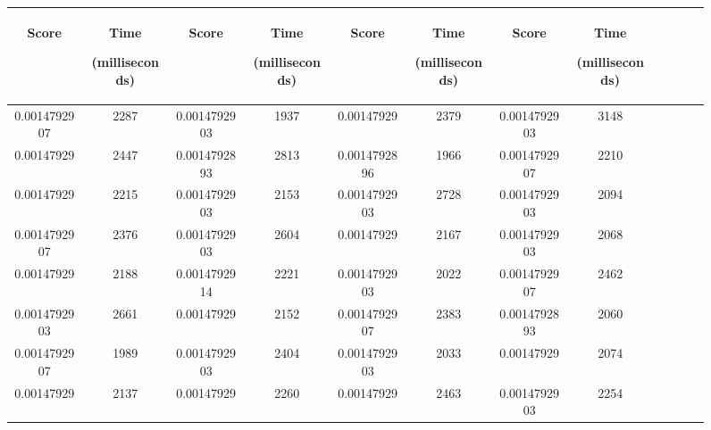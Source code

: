 \begin{figure}[h]
  \centering
  \begin{tabular}{|c|c|c|c|c|c|c|c|c|c|c|c|} 
  \midrule
 \begin{sideways}Score\end{sideways}& \begin{sideways}Time\end{sideways} \begin{sideways} (milliseconds)\end{sideways}& \begin{sideways}Score\end{sideways}& \begin{sideways}Time\end{sideways}  \begin{sideways}(milliseconds)\end{sideways}& \begin{sideways}Score\end{sideways}& \begin{sideways}Time\end{sideways}  \begin{sideways}(milliseconds)\end{sideways}& \begin{sideways}Score\end{sideways}& \begin{sideways}Time\end{sideways}  \begin{sideways} (milliseconds)\end{sideways}\\
\midrule
0.0014792907&2287&0.0014792903&1937&0.00147929&2379&0.0014792903&3148\\
\midrule
0.00147929&2447&0.0014792893&2813&0.0014792896&1966&0.0014792907&2210\\
\midrule
0.00147929&2215&0.0014792903&2153&0.0014792903&2728&0.0014792903&2094\\
\midrule
0.0014792907&2376&0.0014792903&2604&0.00147929&2167&0.0014792903&2068\\
\midrule
0.00147929&2188&0.0014792914&2221&0.0014792903&2022&0.0014792907&2462\\
\midrule
0.0014792903&2661&0.00147929&2152&0.0014792907&2383&0.0014792893&2060\\
\midrule
0.0014792907&1989&0.0014792903&2404&0.0014792903&2033&0.00147929&2074\\
\midrule
0.00147929&2137&0.00147929&2260&0.00147929&2463&0.0014792903&2254\\

\end{tabular}
\end{figure}
